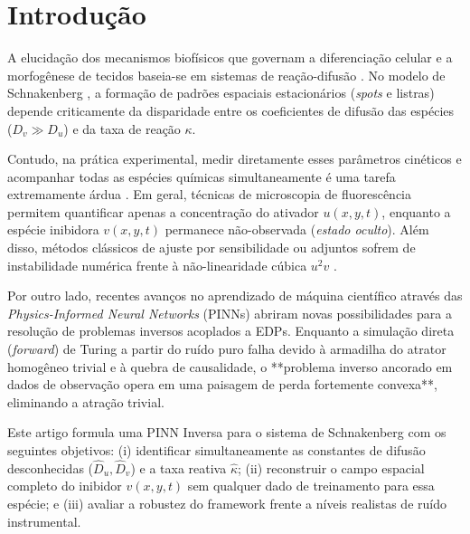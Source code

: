 \documentclass[a4paper, 12pt, twoside]{article}
\begin{document}

\section{Introdução}

A elucidação dos mecanismos biofísicos que governam a diferenciação celular e a morfogênese
de tecidos baseia-se em sistemas de reação-difusão \cite{turing1952morphogenesis, murray2003mathbio}.
No modelo de Schnakenberg \cite{schnakenberg1979simple, pereira2019},
a formação de padrões espaciais estacionários (\textit{spots} e listras) depende criticamente
da disparidade entre os coeficientes de difusão das espécies ($D_v \gg D_u$) e da taxa de reação $\kappa$.

Contudo, na prática experimental, medir diretamente esses parâmetros cinéticos e acompanhar
todas as espécies químicas simultaneamente é uma tarefa extremamente árdua \cite{pereira2019}.
Em geral, técnicas de microscopia de fluorescência permitem quantificar apenas a concentração
do ativador $u(x, y, t)$, enquanto a espécie inibidora $v(x, y, t)$ permanece não-observada
(\textit{estado oculto}). Além disso, métodos clássicos de ajuste por sensibilidade ou adjuntos
sofrem de instabilidade numérica frente à não-linearidade cúbica $u^2 v$ \cite{pereira2019}.

Por outro lado, recentes avanços no aprendizado de máquina científico através das
\textit{Physics-Informed Neural Networks} (PINNs) \cite{raissi2019pinns, karniadakis2021review}
abriram novas possibilidades para a resolução de problemas inversos acoplados a EDPs.
Enquanto a simulação direta (\textit{forward}) de Turing a partir do ruído puro falha devido à
armadilha do atrator homogêneo trivial e à quebra de causalidade, o **problema inverso ancorado
em dados de observação opera em uma paisagem de perda fortemente convexa**, eliminando a atração trivial.

Este artigo formula uma PINN Inversa para o sistema de Schnakenberg com os seguintes objetivos:
(i) identificar simultaneamente as constantes de difusão desconhecidas ($\hat{D}_u, \hat{D}_v$) e
a taxa reativa $\hat{\kappa}$; (ii) reconstruir o campo espacial completo do inibidor $v(x, y, t)$
sem qualquer dado de treinamento para essa espécie; e (iii) avaliar a robustez do framework
frente a níveis realistas de ruído instrumental.

\end{document}
